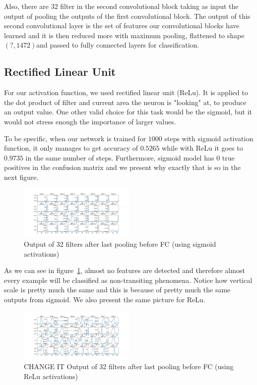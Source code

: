 \documentclass[twoside]{article}
\begin{document}
\begin{multicols}{2}
Also, there are $32$ filter in the second convolutional block taking as input the output of pooling the outputs of the first convolutional block. The output of this second convolutional layer is the set of features our convolutional blocks have learned and it is then reduced more with maximum pooling, flattened to shape $(?,1472) $and passed to fully connected layers for classification.

\subsection{Rectified Linear Unit}
For our activation function, we used rectified linear unit (ReLu). It is applied to the dot product of filter and current area the neuron is "looking" at, to produce an output value. One other valid choice for this task would be the sigmoid, but it would not stress enough the importance of larger values.

To be specific, when our network is trained for $1000$ steps with sigmoid activation function, it only manages to get accuracy of $0.5265$ while with ReLu it goes to $0.9735$ in the same number of steps. Furthermore, sigmoid model has $0$ true positives in the confusion matrix and we present why exactly that is so in the next figure.
\begin{figure}[H]
\includegraphics[width=0.5\textwidth]{sigmoid_pooling2}
\caption{Output of 32 filters after last pooling before FC (using sigmoid activations)}
\label{fig:sigmoid-pool2}
\end{figure}

As we can see in figure~\ref{fig:sigmoid-pool2}, almost no features are detected and therefore almost every example will be classified as non-transiting phenomena. Notice how vertical scale is pretty much the same and this is because of pretty much the same outputs from sigmoid. We also present the same picture for ReLu.
\begin{figure}[H]
\includegraphics[width=0.5\textwidth]{relu_pooling2}
\caption{CHANGE IT Output of 32 filters after last pooling before FC (using ReLu activations)}
\label{fig:relu-pool2}
\end{figure}


\end{multicols}
\end{document}
